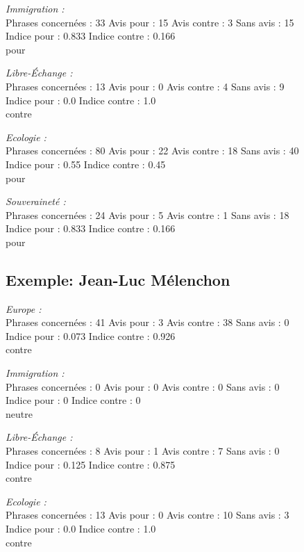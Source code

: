 \documentclass{article}
\begin{document}
\emph{Immigration :}\\
Phrases concernées : 33
Avis pour : 15
Avis contre : 3
Sans avis : 15\\
Indice pour : 0.833
Indice contre : 0.166
\\pour

\emph{Libre-Échange :}\\
Phrases concernées : 13
Avis pour : 0
Avis contre : 4
Sans avis : 9\\
Indice pour : 0.0
Indice contre : 1.0
\\
contre

\emph{Ecologie : }\\
Phrases concernées : 80
Avis pour : 22
Avis contre : 18
Sans avis : 40\\
Indice pour : 0.55
Indice contre : 0.45
\\pour

\emph{Souveraineté : }\\
Phrases concernées : 24
Avis pour : 5
Avis contre : 1
Sans avis : 18\\
Indice pour : 0.833
Indice contre : 0.166
\\pour

\subsection{Exemple: Jean-Luc Mélenchon }

\emph{Europe :} \\
Phrases concernées : 41
Avis pour : 3
Avis contre : 38
Sans avis : 0\\
Indice pour : 0.073
Indice contre : 0.926
\\contre

\emph{Immigration : }\\
Phrases concernées : 0
Avis pour : 0
Avis contre : 0
Sans avis : 0\\
Indice pour : 0
Indice contre : 0
\\neutre

\emph{Libre-Échange : }\\
Phrases concernées : 8
Avis pour : 1
Avis contre : 7
Sans avis : 0\\
Indice pour : 0.125
Indice contre : 0.875
\\contre

\emph{Ecologie : }\\
Phrases concernées : 13
Avis pour : 0
Avis contre : 10
Sans avis : 3\\
Indice pour : 0.0
Indice contre : 1.0
\\contre
\end{document}
